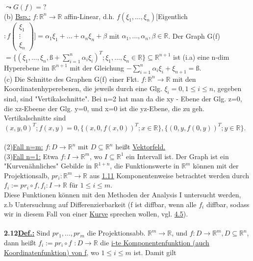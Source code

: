\documentclass[]{scrartcl}
\newcommand{\redcircle}[1]{%
	\tikz[baseline=(char.base)]{
		\node[shape=circle, draw=red, text=red, thick, inner sep=1pt] (char) 
		{\textbf{#1}};
	}%
}
\begin{document}
$\leadsto G(f)=?$\redcircle{Ü}\\
(b) \underline{Bsp.:} $f:\mathbb{R}^n\rightarrow\mathbb{R}$ affin-Linear, d.h.
$f(\xi_1,...,\xi_n)[$Eigentlich$: f\begin{pmatrix}
	\xi_1\\
	\vdots\\
	\xi_n
\end{pmatrix}]= \alpha_1\xi_1+...+\alpha_n\xi_n+\beta$
mit $\alpha_1,...,\alpha_n, \beta\in\mathbb{R}$. Der Graph 
G(f)$=\{(\xi_1,...,\xi_n,ß+\sum_{i=1}^{n}\alpha_i\xi_i)^T;\xi_1,...,\xi_n\in\mathbb{R}\}\subseteq\mathbb{R}^{n+1}$
ist (i.a) eine n-dim Hyperebene im $\mathbb{R}^{n+1}$ mit der Gleichung 
$-\sum_{i=1}^{n}\alpha_i\xi_i+\xi_{n+1}=ß$.\\
(c) Die Schnitte des Graphen G(f) einer Fkt. $f:\mathbb{R}^n\rightarrow 
\mathbb{R}$ mit den Koordinatenhyperebenen, die jeweils durch eine Glg. 
$\xi_i=0,1\leq i\leq n$, gegeben sind, sind "Vertikalschnitte". Bei n=2 hat man 
da die xy - Ebene der Glg. z=0, die xz-Ebeene der Glg. y=0, und x=0 ist die 
yz-Ebene, die zu geh. Vertikalschnitte sind ${(x,y,0)^T; f(x,y)=0}, 
\{(x,0,f(x,0))^T;x\in \mathbb{R}\}, \{(0,y,f(0,y))^T;y\in\mathbb{R}\}.$\\
\\
(2)\underline{Fall n=m:} $f: D\rightarrow \mathbb{R}^n$ mit $ D \subseteq 
\mathbb{R}^n$ heißt \ul{Vektorfeld.}\\
(3)\underline{Fall n=1:} Etwa $f:I\rightarrow\mathbb{R}^m$, wo $I \subseteq 
\mathbb{R}^1$ ein Intervall ist. Der Graph ist ein "Kurvenähnliches" Gebilde in 
$\mathbb{R}^{1+n}$, die Funktionswerte in $\mathbb{R}^m$ können mit der 
Projektionsalb, $pr_i:\mathbb{R}^m\rightarrow\mathbb{R}$ aus  
\ul{1.11} Komponentenweise betrachtet werden durch $f_i:= pr_i\circ 
f,f_i:I\rightarrow\mathbb{R}$ für $1\leq i\leq m$.\\
Diese Funktionen können mit den Methoden der Analysis I untersucht werden, z.b 
Untersuchung auf Differenzierbarkeit (f ist diffbar, wenn alle $f_i$ diffbar, 
sodass wir in diesem Fall von einer \ul{Kurve} sprechen wollen, 
vgl. \ul{4.5}).\\
\\
\textbf{2.12\underline{Def.:}} Sind $pr_1,...,pr_m$ die Projektionsabb. 
$\mathbb{R}^m\rightarrow\mathbb{R}$, und $f: D\rightarrow\mathbb{R}^m, 
D\subseteq\mathbb{R}^n$, dann heißt \ul{$f_i:=pr_i\circ f$} 
$:D\rightarrow\mathbb{R}$ die \ul{i-te Komponentenfunktion (auch 
Koordinatenfunktion) von f}, wo $1\leq i \leq m$ ist. Damit gilt 
\end{document}
